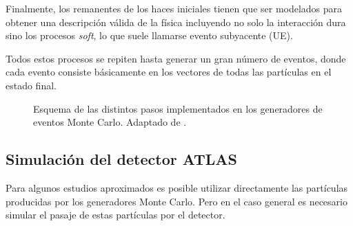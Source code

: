 Finalmente, los remanentes de los haces iniciales tienen que ser modelados
para obtener una descripción válida de la física incluyendo no solo la
interacción dura sino los procesos \emph{soft}, lo que suele llamarse evento
subyacente (UE).

Todos estos procesos se repiten hasta generar un gran número de eventos, donde cada
evento consiste básicamente en los vectores de todas las partículas en el estado
final.






\begin{figure}[!h]
  \centering

  \scalebox{0.9}{}

  \caption{Esquema de las distintos pasos implementados en los generadores de
    eventos Monte Carlo. Adaptado de \cite{Baer:2009tk}.}
  \label{fig:mc_event_generator}

\end{figure}


\subsection{Simulación del detector ATLAS}
\label{sec:sim_atlas}

Para algunos estudios aproximados es posible utilizar directamente las
partículas producidas por los generadores Monte Carlo. Pero en el caso general
es necesario simular el pasaje de estas partículas por el detector.

